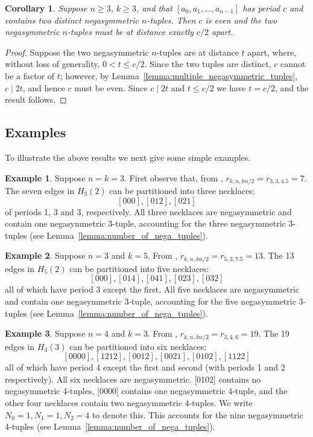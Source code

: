 \documentclass[a4paper,11pt]{article}
\theoremstyle{plain}
\newtheorem{corollary}[lemma]{Corollary}
\theoremstyle{definition}
\newtheorem{example}{Example}[section]
\theoremstyle{remark}
\begin{document}
\begin{corollary}  \label{corollary:two_negatuples_means_n_even}
Suppose $n\geq3$, $k\geq3$, and that $[a_0,a_1,\dots,a_{n-1}]$ has
period $c$ and contains two distinct negasymmetric $n$-tuples. Then $c$ is even and the two
negasymmetric $n$-tuples must be at distance exactly $c/2$ apart.
\end{corollary}

\begin{proof}
Suppose the two negasymmetric $n$-tuples are at distance $t$ apart, where, without loss of
generality, $0< t\leq c/2$. Since the two tuples are distinct, $c$ cannot be a factor of $t$;
however, by Lemma~\ref{lemma:multiple_negasymmetric_tuples}, $c\mid 2t$, and hence $c$ must be
even. Since $c\mid 2t$ and $t\leq c/2$ we have $t=c/2$, and the result follows.
\end{proof}


\subsection{Examples}  \label{subsection:examples}

To illustrate the above results we next give some simple examples.

\begin{example}  \label{example:n3k3}
Suppose $n=k=3$. First observe that, from \cite[Table 2]{Mitchell25a},
$r_{k,n,kn/2}=r_{3,3,4.5}=7$. The seven edges in $H_3(2)$ can be partitioned into three necklaces:
\[ [000], [012], [021] \]
of periods 1, 3 and 3, respectively. All three necklaces are negasymmetric and contain one
negasymmetric $3$-tuple, accounting for the three negasymmetric 3-tuples (see
Lemma~\ref{lemma:number_of_nega_tuples}).
\end{example}

\begin{example}  \label{example:n3k5}
Suppose $n=3$ and $k=5$. From \cite[Table 2]{Mitchell25a}, $r_{k,n,kn/2}=r_{5,3,7.5}=13$. The 13
edges in $H_5(2)$ can be partitioned into five necklaces:
\[ [000], [014], [041], [023], [032] \]
all of which have period 3 except the first. All five necklaces are negasymmetric and contain one
negasymmetric $3$-tuple, accounting for the five negasymmetric 3-tuples (see
Lemma~\ref{lemma:number_of_nega_tuples}).
\end{example}

\begin{example}  \label{example:n4k3}
Suppose $n=4$ and $k=3$. From \cite[Table 2]{Mitchell25a}, $r_{k,n,kn/2}=r_{3,4,6}=19$. The 19
edges in $H_3(3)$ can be partitioned into six necklaces:
\[ [0000], [1212], [0012], [0021], [0102], [1122] \]
all of which have period 4 except the first and second (with periods 1 and 2 respectively). All six
necklaces are negasymmetric.  [0102] contains no negasymmetric 4-tuples, [0000] contains one
negasymmetric 4-tuple, and the other four necklaces contain two negasymmetric 4-tuples.  We write
$N_0=1, N_1=1, N_2=4$ to denote this. This accounts for the nine negasymmetric 4-tuples (see
Lemma~\ref{lemma:number_of_nega_tuples}).
\end{example}
\end{document}
